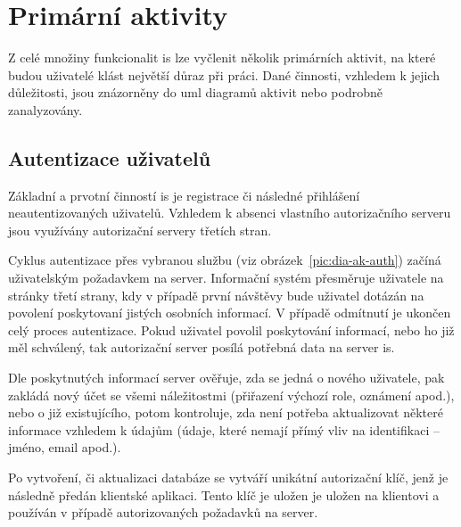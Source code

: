 \section{Primární aktivity}

Z celé množiny funkcionalit \gls{is} lze vyčlenit několik primárních aktivit, na které budou uživatelé klást největší důraz při práci. Dané činnosti, vzhledem k jejich důležitosti, jsou znázorněny do \gls{uml} diagramů aktivit nebo podrobně zanalyzovány.




\subsection{Autentizace uživatelů}

Základní a prvotní činností \gls{is} je registrace či následné přihlášení neautentizovaných uživatelů. Vzhledem k absenci vlastního autorizačního serveru jsou využívány autorizační servery třetích stran.

Cyklus autentizace přes vybranou službu (viz obrázek~\ref{pic:dia-ak-auth}) začíná uživatelským požadavkem na server. Informační systém přesměruje uživatele na stránky třetí strany, kdy v případě první návštěvy bude uživatel dotázán na povolení poskytovaní jistých osobních informací. V případě odmítnutí je ukončen celý proces autentizace. Pokud uživatel povolil poskytování informací, nebo ho již měl schválený, tak autorizační server posílá potřebná data na server \gls{is}.

Dle poskytnutých informací server ověřuje, zda se jedná o nového uživatele, pak zakládá nový účet se všemi náležitostmi (přiřazení výchozí role, oznámení apod.), nebo o již existujícího, potom kontroluje, zda není potřeba aktualizovat některé informace vzhledem k údajům (údaje, které nemají přímý vliv na identifikaci -- jméno, email apod.).

Po vytvoření, či aktualizaci databáze se vytváří unikátní autorizační klíč, jenž je následně předán klientské aplikaci. Tento klíč je uložen je uložen na klientovi a používán v případě autorizovaných požadavků na server.


